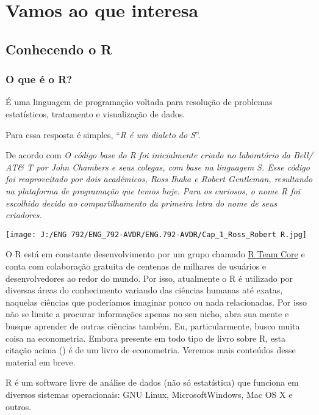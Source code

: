 \documentclass[
]{book}
\begin{document}
\hypertarget{vamos-ao-que-interesa}{%
\chapter{Vamos ao que interesa}\label{vamos-ao-que-interesa}}

\hypertarget{conhecendo-o-r}{%
\section{Conhecendo o R}\label{conhecendo-o-r}}

\hypertarget{o-que-uxe9-o-r}{%
\subsection{O que é o R?}\label{o-que-uxe9-o-r}}

É uma linguagem de programação voltada para resolução de problemas estatísticos, tratamento e visualização de dados.

Para \citet{RogerPeng2020RPro} essa resposta é simples, ``\emph{R é um dialeto do S}''.

De acordo com \citet{perlin2018processamento} \emph{O código base do R foi inicialmente criado no laboratório da Bell/ AT\& T por John Chambers e seus colegas, com base na linguagem S. Esse código foi reaproveitado por dois acadêmicos, Ross Ihaka e Robert Gentleman, resultando na plataforma de programação que temos hoje. Para os curiosos, o nome R foi escolhido devido ao compartilhamento da primeira letra do nome de seus criadores.}

\texttt{[image: J:/ENG 792/ENG\_792-AVDR/ENG.792-AVDR/Cap\_1\_Ross\_Robert R.jpg]}

O R está em constante desenvolvimento por um grupo chamado \href{https://www.r-project.org/}{R Team Core} e conta com colaboração gratuita de centenas de milhares de usuários e desenvolvedores ao redor do mundo.
Por isso, atualmente o R é utilizado por diversas áreas do conhecimento variando das ciências humanas até exatas, naquelas ciências que poderíamos imaginar pouco ou nada relacionadas. Por isso não se limite a procurar informações apenas no seu nicho, abra sua mente e busque aprender de outras ciências também. Eu, particularmente, busco muita coisa na econometria. Embora presente em todo tipo de livro sobre R, esta citação acima (\citet{perlin2018processamento}) é de um livro de econometria. Veremos mais conteúdos desse material em breve.

R é um software livre de análise de dados (não só estatística) que funciona em diversos sistemas operacionais: GNU Linux, MicrosoftWindows, Mac OS X e outros.
\end{document}

